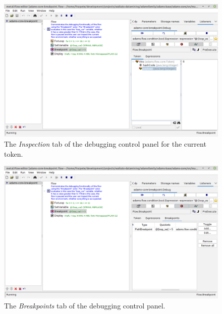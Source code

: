 \begin{figure}[htb]
  \centering
  \includegraphics[width=12.0cm]{images/floweditor-debugging1_inspectionpanel.png}
  \caption{The \textit{Inspection} tab of the debugging control panel for the current token.}
  \label{floweditor-debugging1_inspectionpanel}
\end{figure}

\begin{figure}[htb]
  \centering
  \includegraphics[width=12.0cm]{images/floweditor-debugging1_breakpoints.png}
  \caption{The \textit{Breakpoints} tab of the debugging control panel.}
  \label{floweditor-debugging1_breakpoints}
\end{figure}

